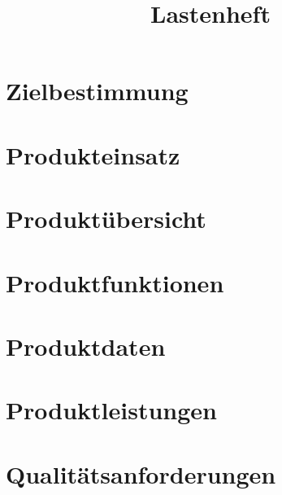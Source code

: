\documentclass[12pt, a4paper]{article}
\title{Lastenheft}
\begin{document}
\maketitle
\pagebreak
\tableofcontents
\pagebreak

\section{Zielbestimmung}
\section{Produkteinsatz}
\section{Produktübersicht}
\section{Produktfunktionen}
\section{Produktdaten}
\section{Produktleistungen}
\section{Qualitätsanforderungen}
\end{document}
